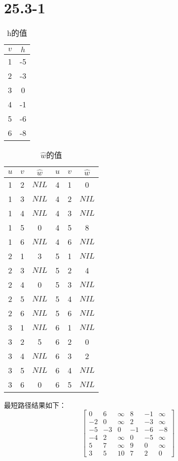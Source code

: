 \documentclass[UTF8]{ctexart}
\begin{document}
    \section{25.3-1}
    \begin{table}[H]
      \centering
      \begin{tabular}{c|c}
          \toprule
          $v$& $h$\\
          \hline
          1& -5\\
          2& -3\\
          3& 0\\
          4& -1\\
          5& -6\\
          6& -8\\
          \bottomrule
      \end{tabular}
      \caption{h的值}
    \end{table}
    \begin{table}[H]
      \centering
      \begin{tabular}{ccc|ccc}
          \toprule
          $u$& $v$& $\hat{w}$& $u$& $v$& $\hat{w}$\\
          \hline
          1& 2& $NIL$& 4& 1& 0\\
          1& 3& $NIL$& 4& 2& $NIL$\\
          1& 4& $NIL$& 4& 3& $NIL$\\
          1& 5& 0& 4& 5& 8\\
          1& 6& $NIL$& 4& 6& $NIL$\\
          2& 1& 3& 5& 1& $NIL$\\
          2& 3& $NIL$& 5& 2& 4\\
          2& 4& 0& 5& 3& $NIL$\\
          2& 5& $NIL$& 5& 4& $NIL$\\
          2& 6& $NIL$& 5& 6& $NIL$\\
          3& 1& $NIL$& 6& 1& $NIL$\\
          3& 2& 5& 6& 2& 0\\
          3& 4& $NIL$& 6& 3& 2\\
          3& 5& $NIL$& 6& 4& $NIL$\\
          3& 6& 0& 6& 5& $NIL$\\
          \bottomrule
      \end{tabular}
      \caption{$\hat{w}$的值}
    \end{table}
    最短路径结果如下：
    \begin{equation*}
      \left[
      \begin{matrix}
        0& 6& \infty& 8& -1& \infty\\
        -2& 0& \infty& 2& -3& \infty\\
        -5& -3& 0& -1& -6& -8\\
        -4& 2& \infty& 0& -5& \infty\\
        5& 7& \infty& 9& 0& \infty\\
        3& 5& 10& 7& 2& 0
      \end{matrix}
      \right]
    \end{equation*}
\end{document}
